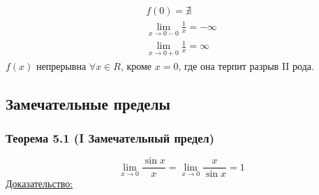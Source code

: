 \documentclass[12pt]{article}
\begin{document}
    \begin{gather*}
        f(0) = \nexists\\
        \lim_{x \to 0-0} \frac{1}{x} = -\infty\\
        \lim_{x \to 0+0} \frac{1}{x} = \infty
    \end{gather*}
    $f(x)$ непрерывна $\forall x \in R$, кроме $x = 0$, где она терпит разрыв II рода.\\

    \subsection{Замечательные пределы}
    \subsubsection*{Теорема 5.1 (I Замечательный предел)}
    \[ \lim_{x\to 0}\frac{\sin x}{x} = \lim_{x\to 0} \frac{x}{\sin x} = 1 \]\noindent
    \underline{Доказательство:}
\end{document}
